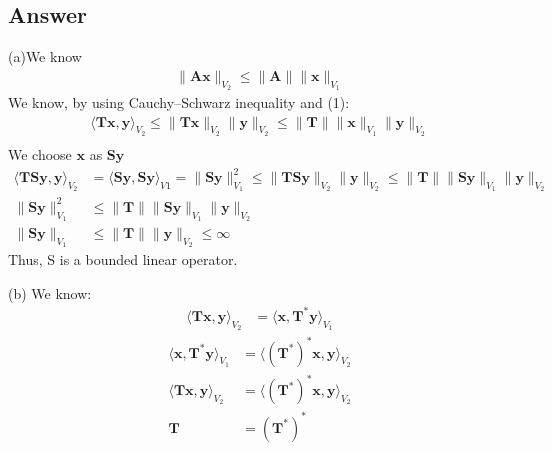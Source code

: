\documentclass[a4paper,12pt]{article}
\begin{document}
\subsection*{Answer}
(a)We know
\begin{align}
    \|\bm{A}\bm{x}\|_{V_2} \leq \|\bm{A}\|\|\bm{x}\|_{V_1}
\end{align}
We know, by using Cauchy–Schwarz inequality and (1):
\begin{align*}
    \langle \bm{T}\bm{x}, \bm{y}\rangle_{V_2}  \leq \|\bm{T}\bm{x}\|_{V_2}\|\bm{y}\|_{V_2} \leq \|\bm{T}\|\|\bm{x}\|_{V_1}\|\bm{y}\|_{V_2} \\
\end{align*}
We choose \(\bm{x}\) as \(\bm{S}\bm{y}\)
\begin{align*}
    \langle \bm{T}\bm{S}\bm{y}, \bm{y}\rangle_{V_2} &= \langle \bm{S}\bm{y}, \bm{S}\bm{y}\rangle_{V1} = \|\bm{S}\bm{y}\|_{V_1}^2   \leq \|\bm{T}\bm{S}\bm{y}\|_{V_2}\|\bm{y}\|_{V_2} \leq \|\bm{T}\|\|\bm{S}\bm{y}\|_{V_1}\|\bm{y}\|_{V_2} \\
    \|\bm{S}\bm{y}\|_{V_1}^2 &\leq \|\bm{T}\|\|\bm{S}\bm{y}\|_{V_1}\|\bm{y}\|_{V_2}  \\
    \|\bm{S}\bm{y}\|_{V_1} &\leq \|\bm{T}\|\|\bm{y}\|_{V_2}  \leq \infty
\end{align*}
Thus, S is a bounded linear operator.

\vspace{1cm}
\noindent
(b) 
We know:
\begin{align*}
    \langle \bm{T}\bm{x}, \bm{y}\rangle_{V_2} &= \langle \bm{x}, \bm{T}^*\bm{y}\rangle_{V_1} 
\end{align*}
\begin{align*}
    \langle \bm{x}, \bm{T}^*\bm{y}\rangle_{V_1} &= \langle (\bm{T}^*)^*\bm{x}, \bm{y}\rangle_{V_2} \\
    \langle \bm{T}\bm{x}, \bm{y}\rangle_{V_2} &= \langle (\bm{T}^*)^*\bm{x}, \bm{y}\rangle_{V_2} \\
    \bm{T} &= (\bm{T}^*)^*
\end{align*}
\end{document}
